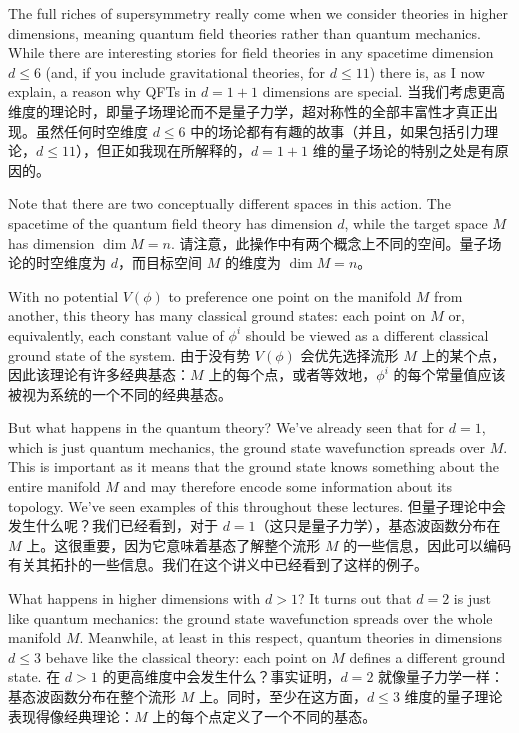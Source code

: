 \documentclass{ctexart}
\begin{document}
\begin{paracol}{2}
The full riches of supersymmetry really come when we consider theories in higher dimensions, meaning quantum ﬁeld theories rather than quantum mechanics. While there are interesting stories for ﬁeld theories in any spacetime dimension $d \leq 6$ (and, if you include gravitational theories, for $d \leq 11$) there is, as I now explain, a reason why QFTs in $d = 1 + 1$ dimensions are special.
\switchcolumn
当我们考虑更高维度的理论时，即量子场理论而不是量子力学，超对称性的全部丰富性才真正出现。虽然任何时空维度 $d \leq 6$ 中的场论都有有趣的故事（并且，如果包括引力理论，$d \leq 11$），但正如我现在所解释的，$d = 1 + 1$ 维的量子场论的特别之处是有原因的。
\switchcolumn*

Note that there are two conceptually diﬀerent spaces in this action. The spacetime of the quantum ﬁeld theory has dimension $d$, while the target space $M$ has dimension $\dim M = n$.
\switchcolumn
请注意，此操作中有两个概念上不同的空间。量子场论的时空维度为 $d$，而目标空间 $M$ 的维度为 $\dim M = n$。
\switchcolumn*

With no potential $V(\phi)$ to preference one point on the manifold $M$ from another, this theory has many classical ground states: each point on $M$ or, equivalently, each constant value of $\phi^i$ should be viewed as a diﬀerent classical ground state of the system.
\switchcolumn
由于没有势 $V(\phi)$ 会优先选择流形 $M$ 上的某个点，因此该理论有许多经典基态：$M$ 上的每个点，或者等效地，$\phi^i$ 的每个常量值应该被视为系统的一个不同的经典基态。
\switchcolumn*

But what happens in the quantum theory? We've already seen that for $d = 1$, which is just quantum mechanics, the ground state wavefunction spreads over $M$. This is important as it means that the ground state knows something about the entire manifold $M$ and may therefore encode some information about its topology. We've seen examples of this throughout these lectures.
\switchcolumn
但量子理论中会发生什么呢？我们已经看到，对于 $d = 1$（这只是量子力学），基态波函数分布在 $M$ 上。这很重要，因为它意味着基态了解整个流形 $M$ 的一些信息，因此可以编码有关其拓扑的一些信息。我们在这个讲义中已经看到了这样的例子。
\switchcolumn*

What happens in higher dimensions with $d > 1$? It turns out that $d = 2$ is just like quantum mechanics: the ground state wavefunction spreads over the whole manifold $M$. Meanwhile, at least in this respect, quantum theories in dimensions $d \leq 3$ behave like the classical theory: each point on $M$ deﬁnes a diﬀerent ground state.
\switchcolumn
在 $d > 1$ 的更高维度中会发生什么？事实证明，$d = 2$ 就像量子力学一样：基态波函数分布在整个流形 $M$ 上。同时，至少在这方面，$d \leq 3$ 维度的量子理论表现得像经典理论：$M$ 上的每个点定义了一个不同的基态。
\switchcolumn*


\end{paracol}
\end{document}
